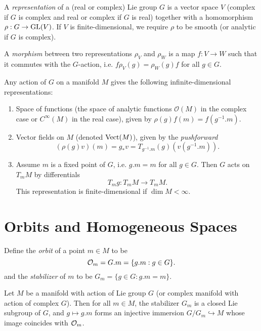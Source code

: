 \begin{definition}
  A \emph{representation} of a (real or
  complex) Lie group $G$ is a vector space
  $V$ (complex if $G$ is complex and real or
  complex if $G$ is real) together with
  a homomorphism $\rho : G \to \operatorname{GL}(V)$.
  If $V$ is finite-dimensional, we require
  $\rho$ to be smooth (or analytic if
  $G$ is complex).

  A \emph{morphism} between two
  representations $\rho_V$ and
  $\rho_W$ is a map
  $f : V \to W$ such that
  it commutes with the $G$-action, i.e.
  $f \rho_V(g) = \rho_W(g) f$ for all
  $g \in G$.
\end{definition}

\begin{remark}
  Any action of $G$ on a manifold $M$
  gives the following infinite-dimensional
  representations:
  \begin{enumerate}
    \item Space of functions
      (the space of analytic functions
      $\mathcal{O}(M)$ in the complex
      case or $C^\infty(M)$ in the real case),
      given by
      $\rho(g) f(m) = f(g^{-1} . m)$.
    \item Vector fields on $M$
      (denoted $\operatorname{Vect}(M)$), given by
      the \emph{pushforward}
      \[(\rho(g) v)(m) = g_* v = T_{g^{-1} . m} (g) (v(g^{-1} . m)).\]
    \item Assume $m$ is a fixed
      point of $G$, i.e. $g . m = m$
      for all $g \in G$. Then $G$ acts
      on $T_m M$ by differentials
      \[
        T_m g : T_m M \to T_m M.
      \]
      This representation is
      finite-dimensional if $\dim M < \infty$.
  \end{enumerate}
\end{remark}

\section{Orbits and Homogeneous Spaces}
\begin{definition}
  Define the \emph{orbit} of a point
  $m \in M$ to be
  \[\mathcal{O}_m = G . m = \{g . m : g \in G\}.\]
  and the \emph{stabilizer} of $m$ to be
  $G_m = \{g \in G : g . m = m\}$.
\end{definition}

\begin{theorem}
  Let $M$ be a manifold with action of
  Lie group $G$ (or complex manifold
  with action of complex $G$). Then
  for all $m \in M$, the stabilizer
  $G_m$ is a closed Lie subgroup of $G$,
  and $g \mapsto g . m$ forms an
  injective immersion
  $G / G_m \hookrightarrow M$ whose
  image coincides with $\mathcal{O}_m$.
\end{theorem}

